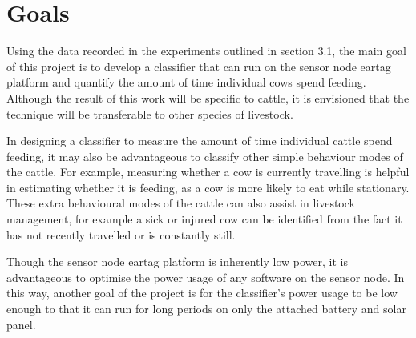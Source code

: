 \section{Goals}

Using the data recorded in the experiments outlined in section 3.1, the main goal of this project is to develop a classifier that can run on the sensor node eartag platform and quantify the amount of time individual cows spend feeding. Although the result of this work will be specific to cattle, it is envisioned that the technique will be transferable to other species of livestock. 

In designing a classifier to measure the amount of time individual cattle spend feeding, it may also be advantageous to classify other simple behaviour modes of the cattle. For example, measuring whether a cow is currently travelling is helpful in estimating whether it is feeding, as a cow is more likely to eat while stationary. These extra behavioural modes of the cattle can also assist in livestock management, for example a sick or injured cow can be identified from the fact it has not recently travelled or is constantly still. 

Though the sensor node eartag platform is inherently low power, it is advantageous to optimise the power usage of any software on the sensor node. In this way, another goal of the project is for the classifier's power usage to be low enough to that it can run for long periods on only the attached battery and solar panel.
